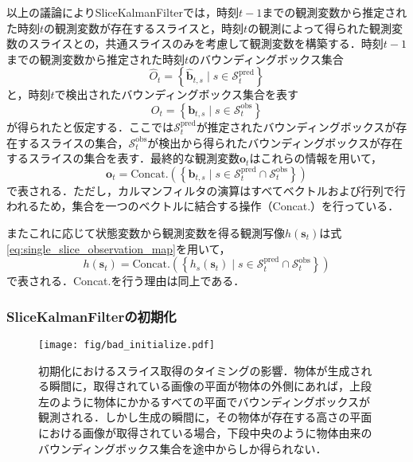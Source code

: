             以上の議論によりSliceKalmanFilterでは，時刻$t-1$までの観測変数から推定された時刻$t$の観測変数が存在するスライスと，時刻$t$の観測によって得られた観測変数のスライスとの，共通スライスのみを考慮して観測変数を構築する．時刻$t-1$までの観測変数から推定された時刻$t$のバウンディングボックス集合
            \begin{equation}
                \label{eq:sliced_bounding_boxes}
                \hat{O}_t = \left\{\hat{\bm{b}}_{t, s} \mid  s \in \mathcal{S}_t^{\text{pred}}\right\}
            \end{equation}
            と，時刻$t$で検出されたバウンディングボックス集合を表す
            \begin{equation}
                \label{eq:observed_bounding_boxes}
                O_t = \left\{\bm{b}_{t,s} \mid s \in \mathcal{S}_t^{\text{obs}}\right\}
            \end{equation}
            が得られたと仮定する．ここでは$\mathcal{S}_t^{\text{pred}}$が推定されたバウンディングボックスが存在するスライスの集合，$\mathcal{S}_t^{\text{obs}}$が検出から得られたバウンディングボックスが存在するスライスの集合を表す．最終的な観測変数$\bm{o}_t$はこれらの情報を用いて，
            \begin{equation}
                \label{eq:skf_observation}
                \bm{o}_t = \text{Concat.}\left(\left\{\bm{b}_{t,s} \mid s \in \mathcal{S}_t^{\text{pred}} \cap \mathcal{S}_t^{\text{obs}}\right\}\right)
            \end{equation}
            で表される．ただし，カルマンフィルタの演算はすべてベクトルおよび行列で行われるため，集合を一つのベクトルに結合する操作（Concat.）を行っている．
            
            またこれに応じて状態変数から観測変数を得る観測写像$h(\bm{s}_t)$は式\ref{eq:single_slice_observation_map}を用いて，
            \begin{equation}
                \label{eq:skf_observation_map}
                h(\bm{s}_t) = \text{Concat.}\left(\left\{h_s(\bm{s}_t) \mid s \in \mathcal{S}_t^{\text{pred}} \cap \mathcal{S}_t^{\text{obs}}\right\}\right)
            \end{equation}
            で表される．Concat.を行う理由は同上である．

            \subsubsection{SliceKalmanFilterの初期化}

            \begin{figure}[t]
                \centering
                \texttt{[image: fig/bad\_initialize.pdf]}
                \caption[初期化におけるスライス取得のタイミングの影響]{初期化におけるスライス取得のタイミングの影響．物体が生成される瞬間に，取得されている画像の平面が物体の外側にあれば，上段左のように物体にかかるすべての平面でバウンディングボックスが観測される．しかし生成の瞬間に，その物体が存在する高さの平面における画像が取得されている場合，下段中央のように物体由来のバウンディングボックス集合を途中からしか得られない．}
                \label{fig:bad_initialize}
            \end{figure}

